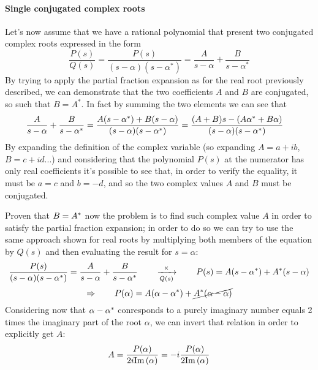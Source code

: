 	\paragraph{Single conjugated complex roots} Let's now assume that we have a rational polynomial that present two conjugated complex roots expressed in the form
		\[ \frac{P(s)}{Q(s)} = \frac{P(s)}{(s-\alpha)(s-\alpha^*)} = \frac A {s-\alpha} + \frac{B}{s-\alpha^*} \]
	By trying to apply the partial fraction expansion as for the real root previously described, we can demonstrate that the two coefficients $A$ and $B$ are conjugated, so such that $B = A^*$. In fact by summing the two elements we can see that
	\begin{align*}
		\frac A {s-\alpha} + \frac{B}{s-\alpha^*} & = \frac{A(s-\alpha^*) + B(s-\alpha)}{(s-\alpha)(s-\alpha^*)} = \frac{(A+B)s - (A \alpha^*+ B\alpha)}{(s-\alpha)(s-\alpha^*)} 	
	\end{align*}
	By expanding the definition of the complex variable (so expanding $A = a+ib$, $B = c+id$...) and considering that the polynomial $P(s)$ at the numerator has only real coefficients it's possible to see that, in order to verify the equality, it must be $a = c$ and $b = - d$, and so the two complex values $A$ and $B$ must be conjugated.
	
	\vspace{3mm} Proven that $B = A^*$ now the problem is to find such complex value $A$ in order to satisfy the partial fraction expansion; in order to do so we can try to use the same approach shown for real roots by multiplying both members of the equation by $Q(s)$ and then evaluating the result for $s = \alpha$:
	\[ \frac{P(s)}{(s-\alpha)(s-\alpha^*)} = \frac A {s-\alpha} + \frac{B}{s-\alpha^*} \qquad \xrightarrow[Q(s)]{\times} \qquad P(s) = A(s-\alpha^*)	+ A^*(s-\alpha)  \]
	\[ \Rightarrow \qquad P(\alpha) = A (\alpha-\alpha^*) + \cancel{A^* (\alpha-\alpha)}\]
	Considering now that $\alpha-\alpha^*$ conresponds to a purely imaginary number equals 2 times the imaginary part of the root $\alpha$, we can invert that relation in order to explicitly get $A$:
	\[ A =\frac{P(\alpha)}{2 i \textrm{Im}\left(\alpha\right)} = - i \frac{P(\alpha)}{2\textrm{Im}\left(\alpha\right)} \]
	
